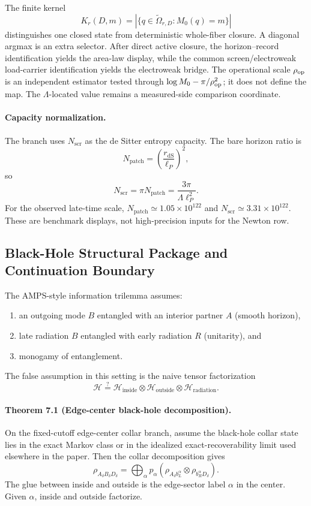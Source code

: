The finite kernel
\[
K_r(D,m)=|\{q\in\widetilde\Omega_{r,D}:M_0(q)=m\}|
\]
distinguishes one closed state from deterministic whole-fiber closure. A
diagonal argmax is an extra selector. After direct active closure, the
horizon--record identification yields the area-law display, while the
common screen/electroweak load-carrier identification yields the electroweak bridge. The
operational scale \(\rho_{\rm op}\) is an independent estimator tested through
\(\log M_0-\pi/\rho_{\rm op}^2\); it does not define the map. The
\(\Lambda\)-located value remains a measured-side comparison coordinate.

\paragraph{\textbf{Capacity normalization.}}
The branch uses \(N_{\mathrm{scr}}\) as the de Sitter entropy capacity. The bare horizon ratio is
\[
N_{\mathrm{patch}}=\left(\frac{r_{\mathrm{dS}}}{\ell_P}\right)^2,
\]
so
\[
N_{\mathrm{scr}}=\pi N_{\mathrm{patch}}
=\frac{3\pi}{\Lambda\ell_P^2}.
\]
For the observed late-time scale, \(N_{\mathrm{patch}}\simeq1.05\times10^{122}\) and
\(N_{\mathrm{scr}}\simeq3.31\times10^{122}\).
These are benchmark displays, not high-precision inputs for the Newton row.

\subsection{Black-Hole Structural Package and Continuation Boundary}

The AMPS-style information trilemma assumes:
\begin{enumerate}[leftmargin=2em]
\item an outgoing mode \(B\) entangled with an interior partner \(A\) (smooth horizon),
\item late radiation \(B\) entangled with early radiation \(R\) (unitarity), and
\item monogamy of entanglement.
\end{enumerate}
The false assumption in this setting is the naive tensor factorization
\[
\mathcal H \stackrel{?}{=}
\mathcal H_{\mathrm{inside}}\otimes
\mathcal H_{\mathrm{outside}}\otimes
\mathcal H_{\mathrm{radiation}}.
\]

\paragraph{\textbf{Theorem 7.1 (Edge-center black-hole decomposition).}}
On the fixed-cutoff edge-center collar branch, assume the black-hole collar state lies in the
exact Markov class or in the idealized exact-recoverability limit used elsewhere
in the paper. Then the collar decomposition gives
\[
\rho_{A_\delta B_\delta D_\delta}
=
\bigoplus_\alpha p_\alpha
\left(\rho_{A_\delta b_L^\alpha}\otimes \rho_{b_R^\alpha D_\delta}\right).
\]
The glue between inside and outside is the edge-sector label \(\alpha\) in the center.
Given \(\alpha\), inside and outside factorize.

